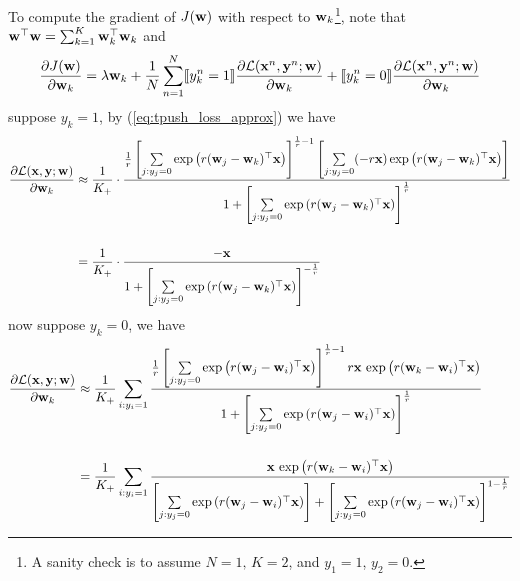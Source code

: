 To compute the gradient of $J(\mathbf{w})$ with respect to $\mathbf{w}_k$\footnote{A sanity check is to assume $N=1, \, K=2$, and $y_1 = 1$, $y_2=0$.},
note that $\mathbf{w}^\top \mathbf{w} = \sum_{k=1}^K \mathbf{w}_k^\top \mathbf{w}_k$ and 
$$
\frac{\partial J(\mathbf{w})} {\partial \mathbf{w}_k} 
= \lambda \mathbf{w}_k + \frac{1}{N} \sum_{n=1}^N 
  \llbracket y_k^n = 1 \rrbracket
  \frac{\partial \mathcal{L}(\mathbf{x}^n, \mathbf{y}^n; \mathbf{w})} {\partial \mathbf{w}_k} + 
  \llbracket y_k^n = 0 \rrbracket
  \frac{\partial \mathcal{L}(\mathbf{x}^n, \mathbf{y}^n; \mathbf{w})} {\partial \mathbf{w}_k}
$$
%
suppose $y_k = 1$, by (\ref{eq:tpush_loss_approx}) we have
\begin{equation}
\label{eq:grad_of_loss_pos}
\begin{aligned}
\frac{\partial \mathcal{L}(\mathbf{x}, \mathbf{y}; \mathbf{w})} {\partial \mathbf{w}_k}
&\approx \frac{1}{K_+} \cdot
         \frac{ \frac{1}{r} \left[ \underset{j:y_j=0}{\sum} \exp \left(r (\mathbf{w}_j - \mathbf{w}_k)^\top \mathbf{x} \right) \right]^{\frac{1}{r} - 1} 
                \left[ \underset{j:y_j=0}{\sum} (-r \mathbf{x})  \exp \left( r (\mathbf{w}_j - \mathbf{w}_k)^\top \mathbf{x} \right) \right] }
              { 1 + \left[ \underset{j:y_j=0}{\sum} \exp \left(r (\mathbf{w}_j - \mathbf{w}_k)^\top \mathbf{x} \right) \right]^{\frac{1}{r}} } \\ \\
&= \frac{1}{K_+} \cdot
   \frac{ -\mathbf{x} } { 1 + \left[ \underset{j:y_j=0}{\sum} \exp \left(r (\mathbf{w}_j - \mathbf{w}_k)^\top \mathbf{x} \right) \right]^{-\frac{1}{r}} }
\end{aligned}
\end{equation}
%
now suppose $y_k = 0$, we have
\begin{equation}
\label{eq:grad_of_loss_neg}
\begin{aligned}
\frac{\partial \mathcal{L}(\mathbf{x}, \mathbf{y}; \mathbf{w})} {\partial \mathbf{w}_k}
&\approx \frac{1}{K_+} \sum_{i:y_i=1}
         \frac{ \frac{1}{r} \left[ \underset{j:y_j=0}{\sum} \exp \left(r (\mathbf{w}_j - \mathbf{w}_i)^\top \mathbf{x} \right) \right]^{\frac{1}{r} - 1} 
                r \mathbf{x} \, \exp \left( r (\mathbf{w}_k - \mathbf{w}_i)^\top \mathbf{x} \right) }
              { 1 + \left[ \underset{j:y_j=0}{\sum} \exp \left(r (\mathbf{w}_j - \mathbf{w}_i)^\top \mathbf{x} \right) \right]^{\frac{1}{r}} } \\ \\
&= \frac{1}{K_+} \sum_{i:y_i=1}
   \frac{ \mathbf{x} \, \exp \left( r (\mathbf{w}_k - \mathbf{w}_i)^\top \mathbf{x} \right) }
        { \left[ \underset{j:y_j=0}{\sum} \exp \left(r (\mathbf{w}_j - \mathbf{w}_i)^\top \mathbf{x} \right) \right] +
          \left[ \underset{j:y_j=0}{\sum} \exp \left(r (\mathbf{w}_j - \mathbf{w}_i)^\top \mathbf{x} \right) \right]^{1-\frac{1}{r}} }
\end{aligned}
\end{equation}

